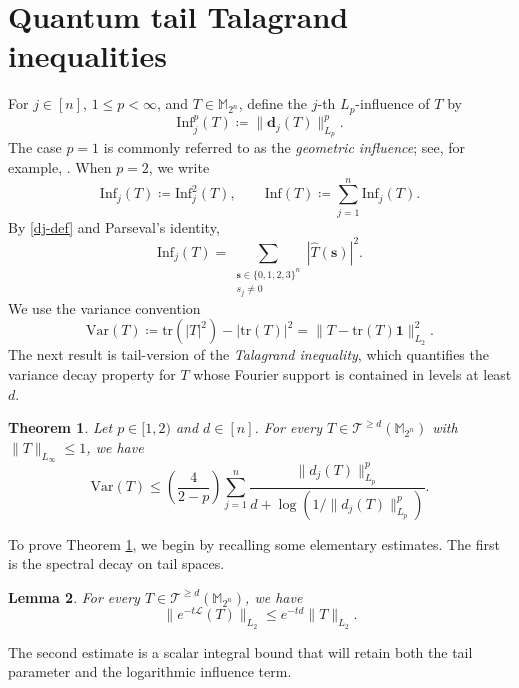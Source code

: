 \documentclass{amsbook}
\newtheorem{theorem}{Theorem}[chapter]
\newtheorem{lemma}[theorem]{Lemma}
\theoremstyle{definition}
\theoremstyle{remark}
\numberwithin{section}{chapter}
\numberwithin{equation}{chapter}
\newcommand{\M}{\mathbb{M}}
\newcommand{\1}{\mathbf{1}}
\newcommand{\s}{\mathbf{s}}
\newcommand{\dc}{\mathbf{d}}
\begin{document}
\section{Quantum tail Talagrand inequalities }\label{improved-talagrand}

For $j\in[n]$, $1\leq p<\infty$, and $T\in\mathbb{M}_{2^n}$, define the
$j$-th $L_p$-influence of $T$ by
\[
\mathrm{Inf}_j^p(T)\coloneqq \|\dc_j(T)\|_{L_p}^p.
\]
The case $p=1$ is commonly referred to as the \emph{geometric influence}; see,
for example, \cite{RWZ2024}.  When $p=2$, we write
\[
\mathrm{Inf}_j(T)\coloneqq \mathrm{Inf}_j^2(T),
\qquad
\mathrm{Inf}(T)\coloneqq \sum_{j=1}^n \mathrm{Inf}_j(T).
\]
By \eqref{dj-def} and Parseval's identity,
\[
\mathrm{Inf}_j(T)=\sum_{\substack{\s\in\{0,1,2,3\}^n\\ s_j\neq0}}|\widehat T(\s)|^2.
\]
We use the variance convention
\[
\mathrm{Var}(T)
 \coloneqq \mathrm{tr}(|T|^2)-|\mathrm{tr}(T)|^2
 =\|T-\mathrm{tr}(T)\mathbf{1}\|_{L_2}^2.
\]
The next result is tail-version of the \emph{Talagrand inequality}, which quantifies the variance decay property for $T$ whose Fourier support is contained in levels at least $d$.

\begin{theorem}\label{lp-tala-d-tail}
Let $p\in[1,2)$ and $d\in [n]$. For every $T\in \mathcal{T}^{\geq d}(\M_{2^n})$ with $\|T\|_{L_\infty}\leq1$,  we have
\[\mathrm{Var}(T)
\leq\left(\frac{4}{2-p}\right)\sum_{j=1}^{n}\frac{\|d_{j}(T)\|^{p}_{L_p}}{d+\log\left(1/\|d_{j}(T)\|^{p}_{L_p}\right)}.\]
\end{theorem}

To prove Theorem \ref{lp-tala-d-tail}, we begin by recalling some elementary estimates.  The first is the spectral decay on tail spaces.

\begin{lemma}\label{etl-t-l2-pd}
For every $T \in \mathcal{T}^{\geq d}(\M_{2^n})$, we have
$$\|e^{-t \mathcal{L}}(T)\|_{L_{2}} \leq e^{-td}\|T\|_{L_{2}}.$$
\end{lemma}


The second estimate is a scalar integral bound that will retain both the tail parameter and the logarithmic influence term.
\end{document}
